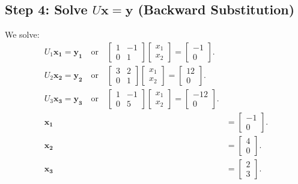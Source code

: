 \documentclass{beamer}
\theoremstyle{remark}
\numberwithin{equation}{section}
\begin{document}
\begin{frame}[fragile]
    	\subsection*{Step 4: Solve $U\mathbf{x} = \mathbf{y}$ (Backward Substitution)}
	We solve:
	\begin{align}
		U_1\mathbf{x_1} = \mathbf{y_1} \quad \text{or} \quad \begin{bmatrix} 1 & -1 \\ 0 & 1 \end{bmatrix} \begin{bmatrix} x_1 \\ x_2 \end{bmatrix} = \begin{bmatrix} -1 \\ 0 \end{bmatrix}.\\
        U_2\mathbf{x_2} = \mathbf{y_2} \quad \text{or} \quad \begin{bmatrix} 3 & 2 \\ 0 & 1 \end{bmatrix} \begin{bmatrix} x_1 \\ x_2 \end{bmatrix} = \begin{bmatrix} 12 \\ 0 \end{bmatrix}.\\
        U_3\mathbf{x_3} = \mathbf{y_3} \quad \text{or} \quad \begin{bmatrix} 1 & -1 \\ 0 & 5 \end{bmatrix} \begin{bmatrix} x_1 \\ x_2 \end{bmatrix} = \begin{bmatrix} -12 \\ 0 \end{bmatrix}.\\
	    \mathbf{x_1} &= \begin{bmatrix} -1 \\ 0 \end{bmatrix}.\\
        \mathbf{x_2} &= \begin{bmatrix} 4 \\ 0 \end{bmatrix}.\\
        \mathbf{x_3} &= \begin{bmatrix} 2 \\ 3 \end{bmatrix}.
	\end{align}
\end{frame}
\end{document}
